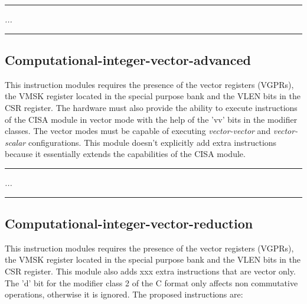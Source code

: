     \par\noindent\rule{\textwidth}{0.4pt}
    \textit{...}
    \par\noindent\rule{\textwidth}{0.4pt}

    \subsection{Computational-integer-vector-advanced}

        This instruction modules requires the presence of the vector registers (VGPRs), the VMSK register located in the special purpose bank and the VLEN bits in the CSR register. The hardware must also provide the ability to execute instructions of the CISA module in vector mode with the help of the 'vv' bits in the modifier classes. The vector modes must be capable of executing \textit{vector-vector} and \textit{vector-scalar} configurations. This module doesn't explicitly add extra instructions because it essentially extends the capabilities of the CISA module.

    \par\noindent\rule{\textwidth}{0.4pt}
    \textit{...}
    \par\noindent\rule{\textwidth}{0.4pt}

    \subsection{Computational-integer-vector-reduction}

        This instruction modules requires the presence of the vector registers (VGPRs), the VMSK register located in the special purpose bank and the VLEN bits in the CSR register. This module also adds xxx extra instructions that are vector only. The 'd' bit for the modifier class 2 of the C format only affects non commutative operations, otherwise it is ignored. The proposed instructions are:

